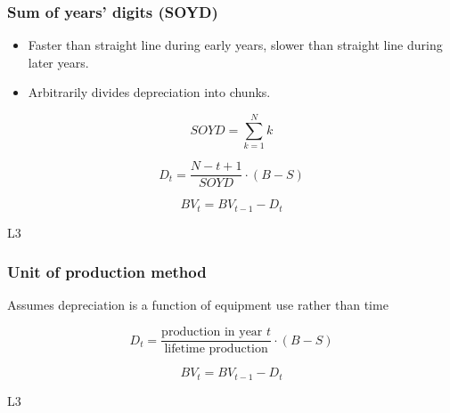 \subsubsection{Sum of years' digits (SOYD)}
\begin{definition}
    \begin{itemize}
        \item Faster than straight line during early years, slower than straight line during later years. 
        \item Arbitrarily divides depreciation into chunks.
    \end{itemize}
        
    \begin{equation}
    SOYD = \sum_{k=1}^{N} k
    \end{equation}
    
    \begin{equation}
    D_t = \frac{N - t + 1}{SOYD} \cdot (B - S)
    \end{equation}
    
    \begin{equation}
    BV_t = BV_{t-1} - D_t
    \end{equation}    
\end{definition}

\begin{example}
    L3
\end{example}

\subsubsection{Unit of production method}
\begin{definition}
    Assumes depreciation is a function of equipment use rather than time

    \begin{equation}
    D_t = \frac{\text{production in year } t}{\text{lifetime production}} \cdot (B - S)
    \end{equation}

    \begin{equation}
    BV_t = BV_{t-1} - D_t
    \end{equation}
\end{definition}

\begin{example}
    L3
\end{example}

